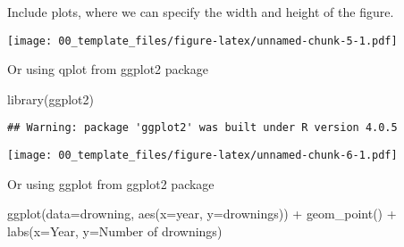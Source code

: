 \documentclass[
]{article}
\newenvironment{Shaded}{\begin{snugshade}}{\end{snugshade}}
\newcommand{\AttributeTok}[1]{\textcolor[rgb]{0.77,0.63,0.00}{#1}}
\newcommand{\CommentTok}[1]{\textcolor[rgb]{0.56,0.35,0.01}{\textit{#1}}}
\newcommand{\FunctionTok}[1]{\textcolor[rgb]{0.00,0.00,0.00}{#1}}
\newcommand{\NormalTok}[1]{#1}
\newcommand{\SpecialCharTok}[1]{\textcolor[rgb]{0.00,0.00,0.00}{#1}}
\newcommand{\StringTok}[1]{\textcolor[rgb]{0.31,0.60,0.02}{#1}}
\begin{document}
Include plots, where we can specify the width and height of the figure.

\begin{Shaded}
\end{Shaded}

\texttt{[image: 00\_template\_files/figure-latex/unnamed-chunk-5-1.pdf]}

Or using qplot from ggplot2 package

\begin{Shaded}
\begin{Highlighting}[]
\FunctionTok{library}\NormalTok{(ggplot2)}
\end{Highlighting}
\end{Shaded}

\begin{verbatim}
## Warning: package 'ggplot2' was built under R version 4.0.5
\end{verbatim}

\begin{Shaded}
\end{Shaded}

\texttt{[image: 00\_template\_files/figure-latex/unnamed-chunk-6-1.pdf]}

Or using ggplot from ggplot2 package

\begin{Shaded}
\begin{Highlighting}[]
\FunctionTok{ggplot}\NormalTok{(}\AttributeTok{data=}\NormalTok{drowning, }\FunctionTok{aes}\NormalTok{(}\AttributeTok{x=}\NormalTok{year, }\AttributeTok{y=}\NormalTok{drownings)) }\SpecialCharTok{+} 
  \FunctionTok{geom\_point}\NormalTok{() }\SpecialCharTok{+}
  \FunctionTok{labs}\NormalTok{(}\AttributeTok{x=}\StringTok{\textquotesingle{}Year\textquotesingle{}}\NormalTok{, }\AttributeTok{y=}\StringTok{\textquotesingle{}Number of drownings\textquotesingle{}}\NormalTok{)}
\end{Highlighting}
\end{Shaded}
\end{document}
